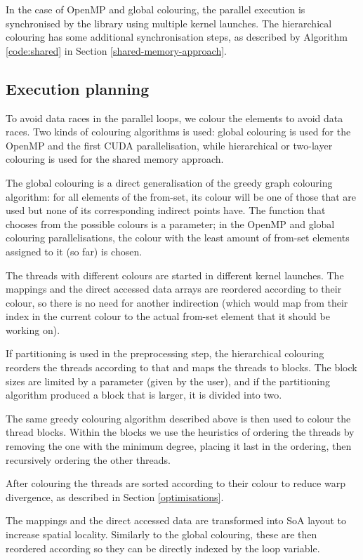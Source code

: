 In the case of OpenMP and global colouring, the parallel execution is
synchronised by the library using multiple kernel launches. The hierarchical
colouring has some additional synchronisation steps, as described by Algorithm
\ref{code:shared} in Section \ref{shared-memory-approach}.

\subsection{Execution planning}

To avoid data races in the parallel loops, we colour the elements to avoid data
races. Two kinds of colouring algorithms is used: global colouring is used for
the OpenMP and the first CUDA parallelisation, while hierarchical or two-layer
colouring is used for the shared memory approach.

The global colouring is a direct generalisation of the greedy graph colouring
algorithm: for all elements of the from-set, its colour will be one of those
that are used but none of its corresponding indirect points have. The function
that chooses from the possible colours is a parameter; in the OpenMP and global
colouring parallelisations, the colour with the least amount of from-set
elements assigned to it (so far) is chosen.

The threads with different colours are started in different kernel launches. The
mappings and the direct accessed data arrays are reordered according to their
colour, so there is no need for another indirection (which would map from their
index in the current colour to the actual from-set element that it should be
working on).

If partitioning is used in the preprocessing step, the hierarchical colouring
reorders the threads according to that and maps the threads to blocks. The block
sizes are limited by a parameter (given by the user), and if the partitioning
algorithm produced a block that is larger, it is divided into two.

The same greedy colouring algorithm described above is then used to colour the
thread blocks. Within the blocks we use the heuristics of ordering the threads
by removing the one with the minimum degree, placing it last in the ordering,
then recursively ordering the other threads.

After colouring the threads are sorted according to their colour to reduce warp
divergence, as described in Section \ref{optimisations}.

The mappings and the direct accessed data are transformed into SoA layout to
increase spatial locality. Similarly to the global colouring, these are then
reordered according so they can be directly indexed by the loop variable.

